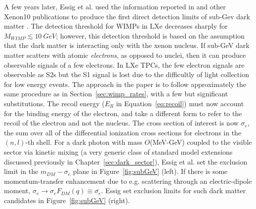 A few years later, Essig et al. used the information reported in \cite{Angle2011} and other Xenon10 publications to produce the first direct detection limits of sub-Gev dark matter \cite{Essig2012}. The detection threshold for \ac{WIMP}s in \ac{LXe} decreases sharply for $M_{WIMP} \lesssim 10~GeV$; however, this detection threshold is based on the assumption that the dark matter is interacting only with the xenon nucleus. If sub-GeV dark matter scatters with atomic \textit{electrons}, as opposed to nuclei, then it can produce observable signals of a few electrons. In \ac{LXe} \ac{TPC}s, the few electron signals are observable as S2s but the S1 signal is lost due to the difficultly of light collection for low energy events. The approach in the paper is to follow approximately the same procedure as in Section~\ref{sec:wimp_rates}, with a few but significant substitutions. The recoil energy ($E_{R}$ in Equation~\ref{eq:recoil}) must now account for the binding energy of the electron, and take a different form to refer to the recoil of the electron and not the nucleus. The cross section of interest is now $\sigma_{e}$, the sum over all of the differential ionization cross sections for electrons in the $(n, l)$-th shell. For a dark photon with mass $O$(MeV-GeV) coupled to the visible sector via kinetic mixing (a very generic class of standard model extensions discussed previously in Chapter~\ref{sec:dark_sector}), Essig et al. set the exclusion limit in the $m_{DM}-\sigma_{e}$ plane in Figure~\ref{fig:subGeV} (left). If there is some momentum-transfer enhancement due to e.g. scattering through an electric-dipole moment, $\sigma_{e} \longrightarrow \sigma_{e}F_{DM}(q) \equiv \bar{\sigma_{e}}$. Essig set exclusion limits for such dark matter candidates in Figure~\ref{fig:subGeV} (right).


